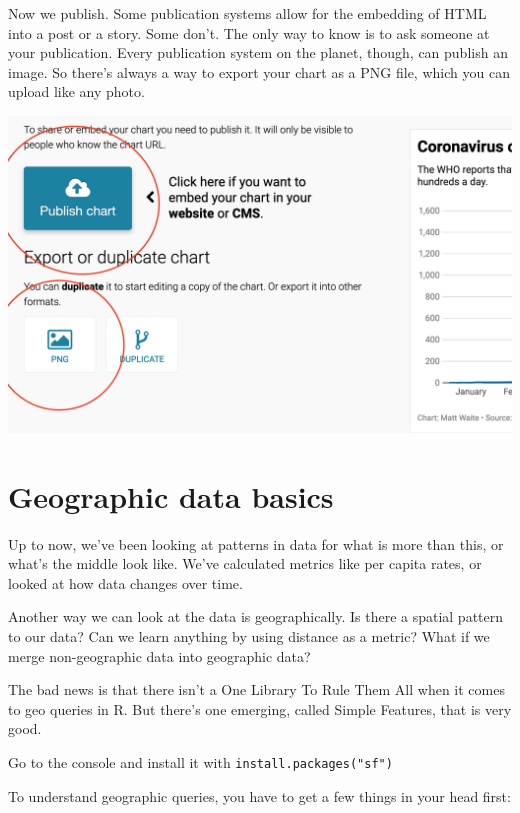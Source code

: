 \documentclass[]{book}
\begin{document}
Now we publish. Some publication systems allow for the embedding of HTML into a post or a story. Some don't. The only way to know is to ask someone at your publication. Every publication system on the planet, though, can publish an image. So there's always a way to export your chart as a PNG file, which you can upload like any photo.

\includegraphics[width=25.31in]{images/datawrapper7}

\hypertarget{geographic-data-basics}{%
\chapter{Geographic data basics}\label{geographic-data-basics}}

Up to now, we've been looking at patterns in data for what is more than this, or what's the middle look like. We've calculated metrics like per capita rates, or looked at how data changes over time.

Another way we can look at the data is geographically. Is there a spatial pattern to our data? Can we learn anything by using distance as a metric? What if we merge non-geographic data into geographic data?

The bad news is that there isn't a One Library To Rule Them All when it comes to geo queries in R. But there's one emerging, called Simple Features, that is very good.

Go to the console and install it with \texttt{install.packages("sf")}

To understand geographic queries, you have to get a few things in your head first:
\end{document}
